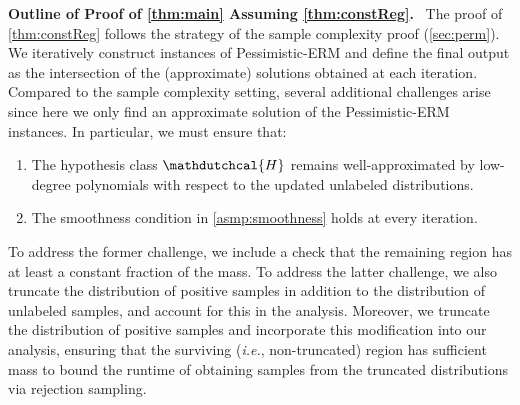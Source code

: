 \documentclass[11pt]{article}
\theoremstyle{plain}
\theoremstyle{definition}
\theoremstyle{remark}
\renewcommand{\paragraph}[1]{\medskip \noindent\textbf{#1}~}
\newcommand{\ie}{\textit{i.e.}}
\newcommand{\hypo}[1]{\mathdutchcal{#1}}
\newcommand{\hyH}{\hypo{H}}
\newcommand{\pERM}{Pessimistic-ERM}
\begin{document}
        \paragraph{Outline of Proof of \cref{thm:main} Assuming \cref{thm:constReg}.}
        The proof of \cref{thm:constReg} follows the strategy of the sample complexity proof (\cref{sec:perm}). 
        We iteratively construct instances of \pERM{} and define the final output as the intersection of the (approximate) solutions obtained at each iteration. 
        Compared to the sample complexity setting, several additional challenges arise since here we only find an approximate solution of the \pERM{} instances. 
        In particular, we must ensure that:
        \begin{enumerate}
            \item The hypothesis class $\hyH$ remains well-approximated by low-degree polynomials with respect to the updated unlabeled distributions.
            \item The smoothness condition in \cref{asmp:smoothness} holds at every iteration.
        \end{enumerate}
        To address the former challenge, we include a check that the remaining region has at least a constant fraction of the mass. 
        To address the latter challenge, we also truncate the distribution of positive samples in addition to the distribution of unlabeled samples, and account for this in the analysis.
        Moreover, we truncate the distribution of positive samples and incorporate this modification into our analysis, ensuring that the surviving (\ie{}, non-truncated) region has sufficient mass to bound the runtime of obtaining samples from the truncated distributions via rejection sampling.
 

    \begin{figure}[omitted: a diagram of this paper's results, not reproduced here]\label{fig:outline:compComplexity}\end{figure}
\end{document}
